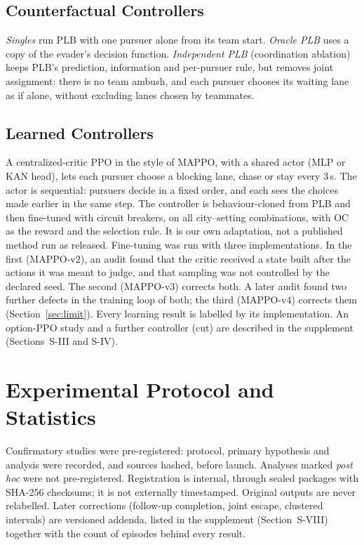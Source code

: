 \documentclass[5p,twocolumn]{elsarticle}
\begin{document}
\subsection{Counterfactual Controllers}

\emph{Singles} run PLB with one pursuer alone from its team start. \emph{Oracle PLB} uses a copy of the evader's
decision function. \emph{Independent PLB} (coordination ablation) keeps PLB's prediction, information and per-pursuer
rule, but removes joint assignment: there is no team ambush, and each pursuer chooses its waiting lane as if alone,
without excluding lanes chosen by teammates.

\subsection{Learned Controllers}

A centralized-critic PPO in the style of MAPPO, with a shared actor (MLP or KAN head), lets each pursuer choose a
blocking lane, chase or stay every 3\,s. The actor is sequential: pursuers decide in a fixed order, and each sees the
choices made earlier in the same step. The controller is behaviour-cloned from PLB and then fine-tuned with circuit
breakers, on all city--setting combinations, with OC as the reward and the selection rule. It is our own adaptation,
not a published method run as released. Fine-tuning was run with three implementations. In the first (MAPPO-v2), an
audit found that the critic received a state built after the actions it was meant to judge, and that sampling was not
controlled by the declared seed. The second (MAPPO-v3) corrects both. A later audit found two further defects in the
training loop of both; the third (MAPPO-v4) corrects them (Section~\ref{sec:limit}). Every learning result is
labelled by its implementation. An option-PPO study and a further controller (cut) are described in the supplement
(Sections~S-III and S-IV).

\section{Experimental Protocol and Statistics}
\label{sec:protocol}

Confirmatory studies were pre-registered: protocol, primary hypothesis and analysis were recorded, and sources hashed,
before launch. Analyses marked \emph{post hoc} were not pre-registered. Registration is internal, through sealed
packages with SHA-256 checksums; it is not externally timestamped. Original outputs are never relabelled. Later
corrections (follow-up completion, joint escape, clustered intervals) are versioned addenda, listed in the supplement
(Section~S-VIII) together with the count of episodes behind every result.
\end{document}
